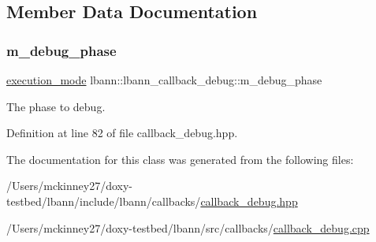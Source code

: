 \subsection{Member Data Documentation}
\mbox{\label{classlbann_1_1lbann__callback__debug_acc66ab699534e42aa958148f1fb3fd6f}} 
\subsubsection{\texorpdfstring{m\+\_\+debug\+\_\+phase}{m\_debug\_phase}}
{\footnotesize\ttfamily \hyperlink{base_8hpp_a2781a159088df64ed7d47cc91c4dc0a8}{execution\+\_\+mode} lbann\+::lbann\+\_\+callback\+\_\+debug\+::m\+\_\+debug\+\_\+phase\hspace{0.3cm}{\ttfamily [private]}}

The phase to debug. 

Definition at line 82 of file callback\+\_\+debug.\+hpp.



The documentation for this class was generated from the following files\+:\begin{DoxyCompactItemize}
\item 
/\+Users/mckinney27/doxy-\/testbed/lbann/include/lbann/callbacks/\hyperlink{callback__debug_8hpp}{callback\+\_\+debug.\+hpp}\item 
/\+Users/mckinney27/doxy-\/testbed/lbann/src/callbacks/\hyperlink{callback__debug_8cpp}{callback\+\_\+debug.\+cpp}\end{DoxyCompactItemize}
